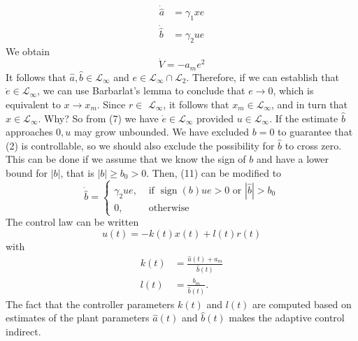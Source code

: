 \documentclass[10pt]{article}
\begin{document}
\begin{multicols*}{2}
\begin{equation*}
	\begin{split}
		\dot{\hat{a}} & = \gamma_1 x e \\
		\dot{\hat{b}} & = \gamma_2 u e
	\end{split}
\end{equation*}
We obtain
\begin{equation*}
	\dot V = -a_m e ^2
\end{equation*}
It follows that $\hat{a}, \hat{b} \in \mathcal{L}_{\infty}$ and $e \in \mathcal{L}_{\infty} \cap \mathcal{L}_2$. Therefore, if we can establish that $\dot{e} \in \mathcal{L}_{\infty}$, we can use Barbarlat's lemma to conclude that $e \rightarrow 0$, which is equivalent to $x \rightarrow x_m$. Since $r \in$ $\mathcal{L}_{\infty}$, it follows that $x_m \in \mathcal{L}_{\infty}$, and in turn that $x \in \mathcal{L}_{\infty}$. Why? So from (7) we have $\dot{e} \in \mathcal{L}_{\infty}$ provided $u \in \mathcal{L}_{\infty}$.  If the estimate $\hat{b}$ approaches $0, u$ may grow unbounded. We have excluded $b=0$ to guarantee that (2) is controllable, so we should also exclude the possibility for $\hat{b}$ to cross zero. This can be done if we assume that we know the sign of $b$ and have a lower bound for $|b|$, that is $|b| \geq b_0>0$. Then, (11) can be modified to
$$
	\dot{\hat{b}}= \begin{cases}\gamma_2 u e, & \text { if } \operatorname{sign}(b) u e>0 \text { or }|\hat{b}|>b_0 \\ 0, & \text { otherwise }\end{cases}
$$
The control law can be written
$$
	u(t)=-k(t) x(t)+l(t) r(t)
$$
with
$$
	\begin{aligned}
		k(t) & =\frac{\hat{a}(t)+a_m}{\hat{b}(t)} \\
		l(t) & =\frac{b_m}{\hat{b}(t)} .
	\end{aligned}
$$
The fact that the controller parameters $k(t)$ and $l(t)$ are computed based on estimates of the plant parameters $\hat{a}(t)$ and $\hat{b}(t)$ makes the adaptive control indirect.

\end{multicols*}
\end{document}
